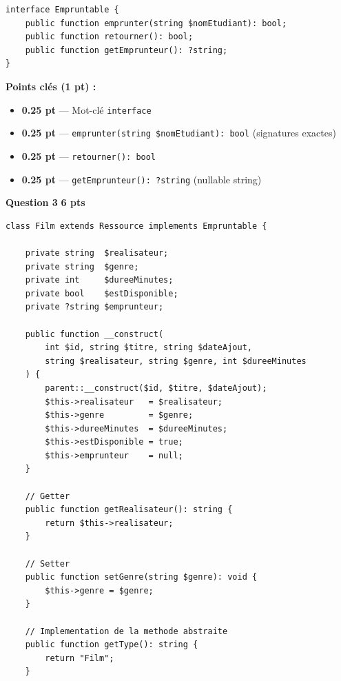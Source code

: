 \documentclass[11pt,a4paper]{article}
\newcommand{\pts}[1]{%
  \hfill\colorbox{pointsbg}{\textcolor{uirgold}{\bfseries\small #1 pts}}%
}
\begin{document}
\begin{tcolorbox}[corrbox, title={Corrigé Q2 --- Interface Empruntable}]
\begin{lstlisting}[language=PHP2]
interface Empruntable {
    public function emprunter(string $nomEtudiant): bool;
    public function retourner(): bool;
    public function getEmprunteur(): ?string;
}
\end{lstlisting}
\end{tcolorbox}

\begin{tcolorbox}[notebox]
\textbf{Points clés (1 pt) :}
\begin{itemize}[itemsep=1pt, topsep=0pt]
  \item \textbf{0.25 pt} --- Mot-clé \texttt{interface}
  \item \textbf{0.25 pt} --- \texttt{emprunter(string \$nomEtudiant): bool} (signatures exactes)
  \item \textbf{0.25 pt} --- \texttt{retourner(): bool}
  \item \textbf{0.25 pt} --- \texttt{getEmprunteur(): ?string} (nullable string)
\end{itemize}
\end{tcolorbox}

\bigskip

\noindent\textbf{Question 3}\pts{6}

\begin{tcolorbox}[corrbox, title={Corrigé Q3 --- Classe Film (1/2) : structure, constructeur, getter, setter, getType()}]
\begin{lstlisting}[language=PHP2]
class Film extends Ressource implements Empruntable {

    private string  $realisateur;
    private string  $genre;
    private int     $dureeMinutes;
    private bool    $estDisponible;
    private ?string $emprunteur;

    public function __construct(
        int $id, string $titre, string $dateAjout,
        string $realisateur, string $genre, int $dureeMinutes
    ) {
        parent::__construct($id, $titre, $dateAjout);
        $this->realisateur   = $realisateur;
        $this->genre         = $genre;
        $this->dureeMinutes  = $dureeMinutes;
        $this->estDisponible = true;
        $this->emprunteur    = null;
    }

    // Getter
    public function getRealisateur(): string {
        return $this->realisateur;
    }

    // Setter
    public function setGenre(string $genre): void {
        $this->genre = $genre;
    }

    // Implementation de la methode abstraite
    public function getType(): string {
        return "Film";
    }
\end{lstlisting}
\end{tcolorbox}
\end{document}
